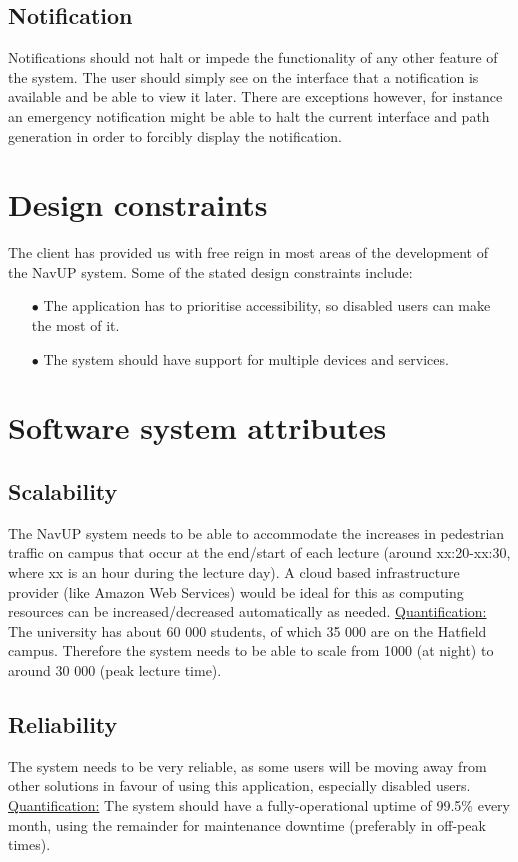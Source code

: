 \documentclass[english]{article}
\begin{document}
	\subsection{Notification}
Notifications should not halt or impede the functionality of any other feature of the system. The user should simply see on the interface that a notification is available and be able to view it later. There are exceptions however, for instance an emergency notification might be able to halt the current interface and path generation in order to forcibly display the notification. 
	\section{Design constraints}
	The client has provided us with free reign in most areas of the development of the NavUP system. Some of the stated design constraints include:
		\begin{itemize}
			\item[$\bullet$] The application has to prioritise accessibility, so disabled users can make the most of it.
			\item[$\bullet$] The system should have support for multiple devices and services.
		\end{itemize}

	\section{Software system attributes}
	\subsection{Scalability}
	The NavUP system needs to be able to accommodate the increases in pedestrian traffic on campus that occur at the end/start of each lecture (around xx:20-xx:30, where xx is an hour during the lecture day). A cloud based infrastructure provider (like Amazon Web Services) would be ideal for this as computing resources can be increased/decreased automatically as needed.
	\newline
	\newline
	\underline{Quantification:} The university has about 60 000 students, of which 35 000 are on the Hatfield campus. Therefore the system needs to be able to scale from 1000 (at night) to around 30 000 (peak lecture time).
	\subsection{Reliability}
	The system needs to be very reliable, as some users will be moving away from other solutions in favour of using this application, especially disabled users.
	\newline
	\newline
	\underline{Quantification:} The system should have a fully-operational uptime of 99.5\% every month, using the remainder for maintenance downtime (preferably in off-peak times).
\end{document}
